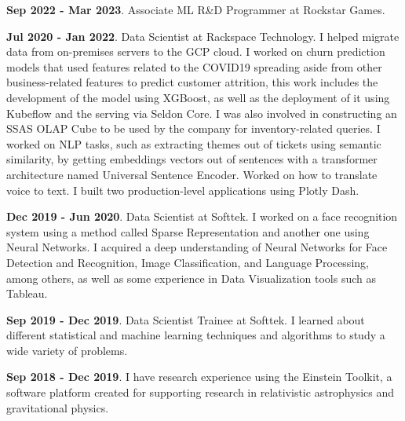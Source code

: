 \documentclass[a4paper,10pt]{article} %
\begin{document}
\textbf{Sep 2022 - Mar 2023}. Associate ML R\&D Programmer at Rockstar Games.

\textbf{Jul 2020 - Jan 2022}. Data Scientist at Rackspace Technology. I helped migrate data from on-premises servers to the GCP cloud. I worked on churn prediction models that used features related to the COVID19 spreading aside from other business-related features to predict customer attrition, this work includes the development of the model using XGBoost, as well as the deployment of it using Kubeflow and the serving via Seldon Core. I was also involved in constructing an SSAS OLAP Cube to be used by the company for inventory-related queries. I worked on NLP tasks, such as extracting themes out of tickets using semantic similarity, by getting embeddings vectors out of sentences with a transformer architecture named Universal Sentence Encoder. Worked on how to translate voice to text. I built two production-level applications using Plotly Dash.

\textbf{Dec 2019 - Jun 2020}. Data Scientist at Softtek. I worked on a face recognition system using a method called Sparse Representation and another one using Neural Networks. I acquired a deep understanding of Neural Networks for Face Detection and Recognition, Image Classification, and Language Processing, among others, as well as some experience in Data Visualization tools such as Tableau.

\textbf{Sep 2019 - Dec 2019}. Data Scientist Trainee at Softtek. I learned about different statistical and machine learning techniques and algorithms to study a wide variety of problems.

\textbf{Sep 2018 - Dec 2019}. I have research experience using the Einstein Toolkit, a software platform created for supporting research in relativistic astrophysics and gravitational physics.
\end{document}

